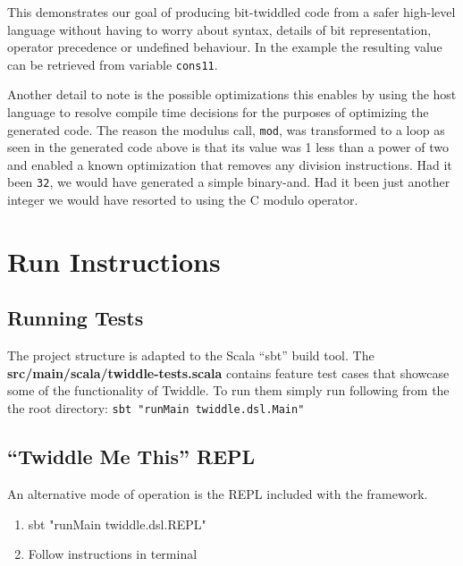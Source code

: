 \documentclass{article}
\begin{document}
This demonstrates our goal of producing bit-twiddled code from a safer high-level language without having to worry about syntax, details of bit representation, operator precedence or undefined behaviour. In the example  the resulting value can be retrieved from variable \texttt{cons11}.

Another detail to note is the possible optimizations this enables by using the host language to resolve compile time decisions for the purposes of optimizing the generated code. The reason the modulus call, \texttt{mod}, was transformed to a loop as seen in the generated code above is that its
value was 1 less than a power of two and enabled a known optimization that removes any division instructions. Had it been \texttt{32}, we would have generated a simple binary-and. Had it been just another integer we would have resorted to using the C modulo operator.

\section{Run Instructions}
\subsection{Running Tests}
The project structure is adapted to the Scala ``sbt'' build tool. The \textbf{src/main/scala/twiddle-tests.scala} contains feature test cases that showcase some of the functionality of Twiddle. To run them simply
run following from the the root directory: \texttt{sbt "runMain twiddle.dsl.Main"}

\subsection{``Twiddle Me This'' REPL}
An alternative mode of operation is the REPL included with the framework.
\begin{enumerate}
	\item sbt "runMain twiddle.dsl.REPL"
	\item Follow instructions in terminal
\end{enumerate}

\pagebreak
\end{document}
